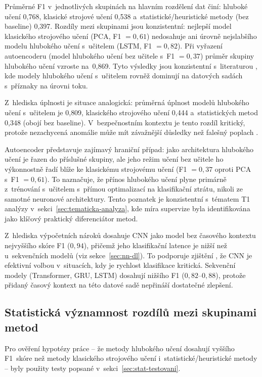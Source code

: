Průměrné F1 v~jednotlivých skupinách na hlavním rozdělení dat činí: hluboké učení 0{,}768, klasické strojové učení 0{,}538 a~statistické/heuristické metody (bez baseline) 0{,}397. Rozdíly mezi skupinami jsou konzistentní: nejlepší model klasického strojového učení (PCA, F1 $= 0{,}61$) nedosahuje ani úrovně nejslabšího modelu hlubokého učení s~učitelem (LSTM, F1 $= 0{,}82$). Při vyřazení autoencoderu (model hlubokého učení bez učitele s~F1 $= 0{,}37$) průměr skupiny hlubokého učení vzroste na~0{,}869. Tyto výsledky jsou konzistentní s~literaturou \parencite{Barut2020}, kde modely hlubokého učení s~učitelem rovněž dominují na datových sadách s~příznaky na úrovni toku.

Z~hlediska úplnosti je situace analogická: průměrná úplnost modelů hlubokého učení s~učitelem je 0{,}809, klasického strojového učení 0{,}444 a~statistických metod 0{,}348 (obojí bez baseline). V~bezpečnostním kontextu je tento rozdíl kritický, protože nezachycená anomálie může mít závažnější důsledky než falešný poplach \parencite{OzkanOkay2021}.

Autoencoder představuje zajímavý hraniční případ: jako architektura hlubokého učení je řazen do příslušné skupiny, ale jeho režim učení bez učitele ho výkonnostně řadí blíže ke klasickému strojovému učení (F1 $= 0{,}37$ oproti PCA s~F1 $= 0{,}61$). To naznačuje, že přínos hlubokého učení plyne primárně z~trénování s~učitelem s~přímou optimalizací na klasifikační ztrátu, nikoli ze samotné neuronové architektury. Tento poznatek je konzistentní s~tématem T1 analýzy v~sekci~\ref{sec:tematicka-analyza}, kde míra supervize byla identifikována jako klíčový praktický diferenciátor metod.

Z~hlediska výpočetních nároků dosahuje CNN jako model bez časového kontextu nejvyššího skóre F1 ($0{,}94$), přičemž jeho klasifikační latence je nižší než u~sekvenčních modelů (viz sekce~\ref{sec:nn-dl}). To podporuje zjištění \textcite{Bakhshi2021}, že CNN je efektivní volbou v~situacích, kdy je rychlost klasifikace kritická. Sekvenční modely (Transformer, GRU, LSTM) dosahují nižšího F1 ($0{,}82$--$0{,}88$), protože přidaný časový kontext na této datové sadě nepřináší dostatečné zlepšení.

\subsection{Statistická významnost rozdílů mezi skupinami metod}
\label{sec:stat-vyznamnost}

Pro ověření hypotézy práce -- že metody hlubokého učení dosahují vyššího F1~skóre než metody klasického strojového učení i~statistické/heuristické metody -- byly použity testy popsané v~sekci~\ref{sec:stat-testovani}.

